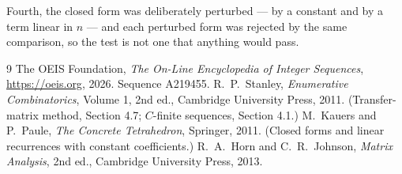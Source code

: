 \documentclass[11pt,a4paper]{article}
\theoremstyle{plain}
\theoremstyle{definition}
\begin{document}
Fourth, the closed form was deliberately perturbed --- by a constant and by a term linear in
$n$ --- and each perturbed form was rejected by the same comparison, so the test is not one
that anything would pass.

\begin{thebibliography}{9}
 The OEIS Foundation, \emph{The On-Line Encyclopedia of Integer
Sequences}, \url{https://oeis.org}, 2026. Sequence A219455.
 R.~P.~Stanley, \emph{Enumerative Combinatorics}, Volume 1, 2nd ed.,
Cambridge University Press, 2011. (Transfer-matrix method, Section 4.7; $C$-finite sequences,
Section 4.1.)
 M.~Kauers and P.~Paule, \emph{The Concrete Tetrahedron}, Springer, 2011.
(Closed forms and linear recurrences with constant coefficients.)
 R.~A.~Horn and C.~R.~Johnson, \emph{Matrix Analysis}, 2nd ed., Cambridge
University Press, 2013.
\end{thebibliography}
\end{document}
